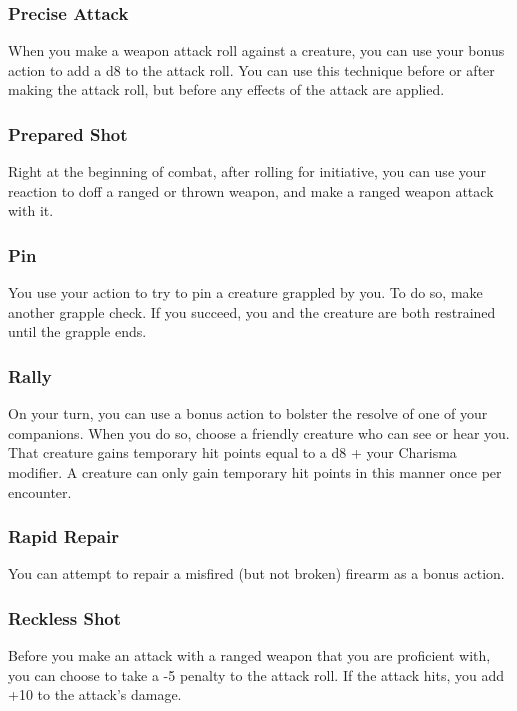 \subsubsection{Precise Attack} \label{tec::preciseattack}
When you make a weapon attack roll against a creature, you can use your bonus action to add a d8 to the attack roll.
You can use this technique before or after making the attack roll, but before any effects of the attack are applied.

\subsubsection{Prepared Shot} \label{tec::preparedshot}
Right at the beginning of combat, after rolling for initiative, you can use your reaction to doff a ranged or thrown weapon, and make a ranged weapon attack with it.

\subsubsection{Pin} \label{tec::pin}
You use your action to try to pin a creature grappled by you.
To do so, make another grapple check.
If you succeed, you and the creature are both restrained until the grapple ends.

\subsubsection{Rally} \label{tec::rally}
On your turn, you can use a bonus action to bolster the resolve of one of your companions.
When you do so, choose a friendly creature who can see or hear you.
That creature gains temporary hit points equal to a d8 + your Charisma modifier.
A creature can only gain temporary hit points in this manner once per encounter.

\subsubsection{Rapid Repair} \label{tec::rapidrepair}
You can attempt to repair a misfired (but not broken) firearm as a bonus action.

\subsubsection{Reckless Shot} \label{tec::recklessshot}
Before you make an attack with a ranged weapon that you are proficient with, you can choose to take a -5 penalty to the attack roll.
If the attack hits, you add +10 to the attack's damage.


